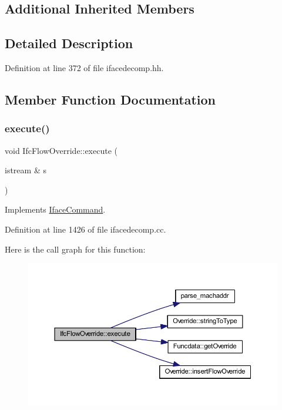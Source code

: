 \subsection*{Additional Inherited Members}


\subsection{Detailed Description}


Definition at line 372 of file ifacedecomp.\+hh.



\subsection{Member Function Documentation}
\mbox{\label{class_ifc_flow_override_a7bb5fdc69ea21e9236a4e015a39c9dac}} 
\subsubsection{\texorpdfstring{execute()}{execute()}}
{\footnotesize\ttfamily void Ifc\+Flow\+Override\+::execute (\begin{DoxyParamCaption}\item[{istream \&}]{s }\end{DoxyParamCaption})\hspace{0.3cm}{\ttfamily [virtual]}}



Implements \mbox{\hyperlink{class_iface_command_af10e29cee2c8e419de6efe9e680ad201}{Iface\+Command}}.



Definition at line 1426 of file ifacedecomp.\+cc.

Here is the call graph for this function\+:
\nopagebreak
\begin{figure}[H]
\begin{center}
\leavevmode
\includegraphics[width=350pt]{class_ifc_flow_override_a7bb5fdc69ea21e9236a4e015a39c9dac_cgraph}
\end{center}
\end{figure}


